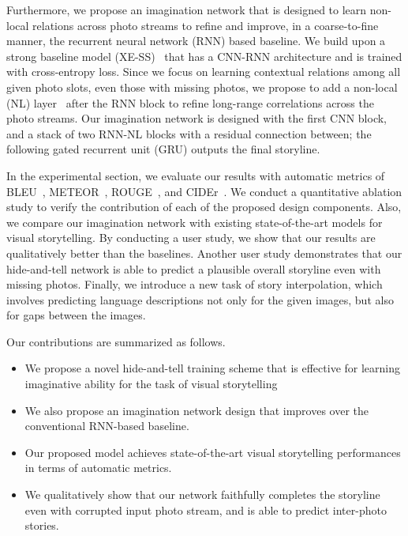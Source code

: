 \documentclass[letterpaper]{article} \usepackage{aaai20}  \usepackage{times}  \usepackage{helvet} \usepackage{courier}  \usepackage[hyphens]{url}  \usepackage{graphicx} \urlstyle{rm} \def\UrlFont{\rm}  \usepackage{graphicx}  \frenchspacing  \setlength{\pdfpagewidth}{8.5in}  \setlength{\pdfpageheight}{11in}
\begin{document}
Furthermore, we propose an imagination network that is designed to learn non-local relations across photo streams to refine and improve, in a coarse-to-fine manner, the recurrent neural network (RNN) based baseline. We build upon a strong baseline model (XE-SS)~\cite{wang2018no} that has a CNN-RNN architecture and is trained with cross-entropy loss. Since we focus on learning contextual relations among all given photo slots, even those with missing photos, we propose to add a non-local (NL) layer~\cite{wang2018non} after the RNN block to refine long-range correlations across the photo streams. Our imagination network is designed with the first CNN block, and a stack of two RNN-NL blocks with a residual connection between; the following gated recurrent unit (GRU) outputs the final storyline.



In the experimental section, we evaluate our results with automatic metrics of BLEU~\cite{papineni2002bleu}, METEOR~\cite{banerjee2005meteor}, ROUGE~\cite{lin2004rouge}, and CIDEr~\cite{vedantam2015cider}. We conduct a quantitative ablation study to verify the contribution of each of the proposed design components. Also, we compare our imagination network with existing state-of-the-art models for visual storytelling. By conducting a user study, we show that our results are qualitatively better than the baselines. Another user study demonstrates that our hide-and-tell network is able to predict a plausible overall storyline even with missing photos. Finally, we introduce a new task of story interpolation, which involves predicting language descriptions not only for the given images, but also for gaps between the images.


Our contributions are summarized as follows.
\begin{itemize}
\item We propose a novel hide-and-tell training scheme that is effective for learning imaginative ability for the task of visual storytelling
\item We also propose an imagination network design that improves over the conventional RNN-based baseline.
\item Our proposed model achieves state-of-the-art visual storytelling performances in terms of automatic metrics.
\item We qualitatively show that our network faithfully completes the storyline even with corrupted input photo stream, and is able to predict inter-photo stories.
\end{itemize}
\end{document}
